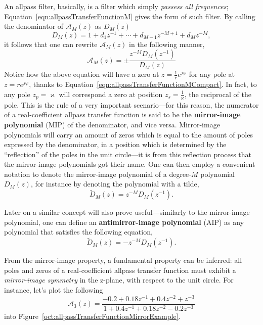 \documentclass[\documentfontsize, twocolumn]{\classname}
\begin{document}
An allpass filter, basically, is a filter which simply \emph{passess all frequences}; Equation~\ref{eqn:allpassTransferFunctionM} gives the form of such filter. By calling the denominator of $\mathcal A_M(z)$ as $D_M(z)$
\[
    D_M(z) = 1 + d_1z^{-1} + \cdots + d_{M-1}z^{-M+1} + d_Mz^{-M},
\]
it follows that one can rewrite $\mathcal A_M(z)$ in the following manner,
\begin{equation}\label{eqn:allpassTransferFunctionMCompact}
    \mathcal A_M(z) = \pm \frac {
        z^{-M} D_M(z^{-1})
    } {
        D_M(z)
    }
\end{equation}
Notice how the above equation will have a zero at $z=\frac 1 r e^{j\varphi}$ for any pole at $z = re^{j\varphi}$, thanks to Equation~\ref{eqn:allpassTransferFunctionMCompact}. In fact, to any pole $z_p = \varkappa$ will correspond a zero at position $z_s = \frac 1 \varkappa$, the reciprocal of the pole. This is the rule of a very important scenario---for this reason, the numerator of a real-coefficient allpass transfer function is said to be the \textbf{mirror-image polynomial} (MIP) of the denominator, and vice versa. Mirror-image polynomials will carry an amount of zeros which is equal to the amount of poles expressed by the denominator, in a position which is determined by the ``reflection'' of the poles in the unit circle---it is from this reflection process that the mirror-image polynomials got their name. One can then employ a convenient notation to denote the mirror-image polynomial of a degree-$M$ polynomial $D_M(z)$, for instance by denoting the polynomial with a tilde,
\begin{equation}\label{eqn:mirrorImagePolynomial}
    \tilde{D}_M(z) = z^{-M}D_M(z^{-1}).
\end{equation}

Later on a similar concept will also prove useful---similarly to the mirror-image polynomial, one can define an \textbf{antimirror-image polynomial} (AIP) as any polynomial that satisfies the following equation,
\begin{equation}\label{eqn:antimirrorImagePolynomial}
    \tilde{D}_M(z) = -z^{-M}D_M(z^{-1}).
\end{equation}


From the mirror-image property, a fundamental property can be inferred: all poles and zeros of a real-coefficient allpass transfer function must exhibit a \emph{mirror-image symmetry} in the z-plane, with respect to the unit circle. For instance, let's plot the following
\[
    \mathcal A_3(z) = \frac {
        -0.2 + 0.18z^{-1} + 0.4z^{-2} + z^{-3}
    } {
        1 + 0.4 z^{-1} + 0.18z^{-2} - 0.2z^{-3}
    }
\]
into Figure~\ref{oct:allpassTransferFunctionMirrorExample}.
\end{document}
